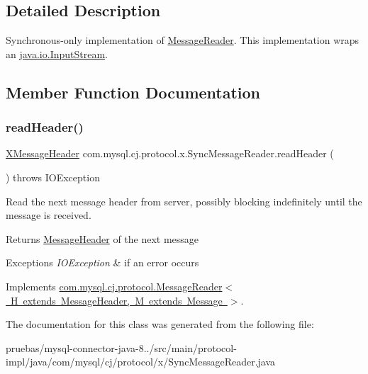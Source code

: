 \subsection{Detailed Description}
Synchronous-\/only implementation of \mbox{\hyperlink{interfacecom_1_1mysql_1_1cj_1_1protocol_1_1_message_reader}{Message\+Reader}}. This implementation wraps an \mbox{\hyperlink{}{java.\+io.\+Input\+Stream}}. 

\subsection{Member Function Documentation}
\mbox{\label{classcom_1_1mysql_1_1cj_1_1protocol_1_1x_1_1_sync_message_reader_a057a4fcddafa78836d874a30205936fc}} 
\subsubsection{\texorpdfstring{read\+Header()}{readHeader()}}
{\footnotesize\ttfamily \mbox{\hyperlink{classcom_1_1mysql_1_1cj_1_1protocol_1_1x_1_1_x_message_header}{X\+Message\+Header}} com.\+mysql.\+cj.\+protocol.\+x.\+Sync\+Message\+Reader.\+read\+Header (\begin{DoxyParamCaption}{ }\end{DoxyParamCaption}) throws I\+O\+Exception}

Read the next message header from server, possibly blocking indefinitely until the message is received.

\begin{DoxyReturn}{Returns}
\mbox{\hyperlink{interfacecom_1_1mysql_1_1cj_1_1protocol_1_1_message_header}{Message\+Header}} of the next message 
\end{DoxyReturn}

\begin{DoxyExceptions}{Exceptions}
{\em I\+O\+Exception} & if an error occurs \\
\hline
\end{DoxyExceptions}


Implements \mbox{\hyperlink{interfacecom_1_1mysql_1_1cj_1_1protocol_1_1_message_reader_a09745b0e30f74fa13e2b32f22ce70cbb}{com.\+mysql.\+cj.\+protocol.\+Message\+Reader$<$ H extends Message\+Header, M extends Message $>$}}.



The documentation for this class was generated from the following file\+:\begin{DoxyCompactItemize}
\item 
pruebas/mysql-\/connector-\/java-\/8../src/main/protocol-\/impl/java/com/mysql/cj/protocol/x/Sync\+Message\+Reader.\+java\end{DoxyCompactItemize}
